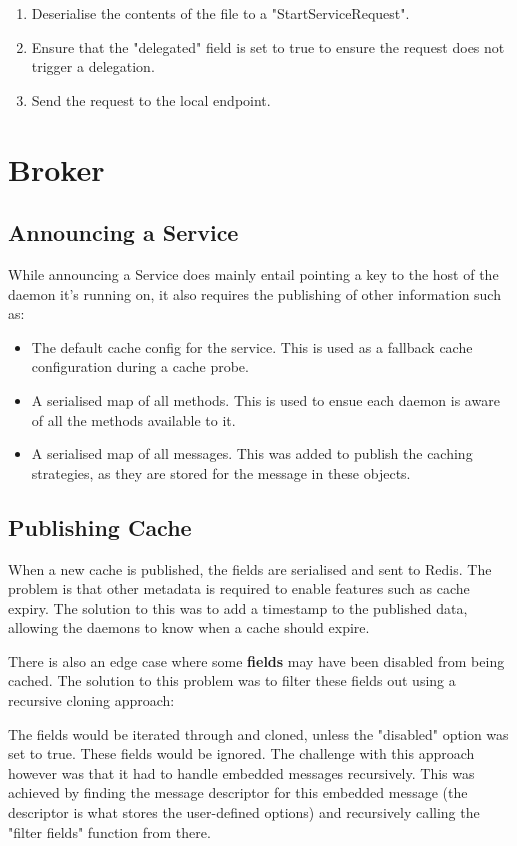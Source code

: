 \documentclass[a4paper,12pt]{report}
\begin{document}
\begin{enumerate}
    \item Deserialise the contents of the file to a "StartServiceRequest".
    \item Ensure that the "delegated" field is set to true to ensure the request does not trigger a delegation.
    \item Send the request to the local  endpoint.
\end{enumerate}

\section{Broker}
\subsection{Announcing a Service}
While announcing a Service does mainly entail pointing a key to the host of the daemon it's running on, it also requires the publishing of other information such as:

\begin{itemize}
    \item The default cache config for the service. This is used as a fallback cache configuration during a cache probe.
    \item A serialised map of all methods. This is used to ensue each daemon is aware of all the methods available to it.
    \item A serialised map of all messages. This was added to publish the caching strategies, as they are stored for the message in these objects.
\end{itemize}

\subsection{Publishing Cache}
When a new cache is published, the fields are serialised and sent to Redis.
The problem is that other metadata is required to enable features such as cache expiry.
The solution to this was to add a timestamp to the published data, allowing the daemons to know when a cache should expire.

There is also an edge case where some \textbf{fields} may have been disabled from being cached. 
The solution to this problem was to filter these fields out using a recursive cloning approach:

The fields would be iterated through and cloned, unless the "disabled" option was set to true. These fields would be ignored.
The challenge with this approach however was that it had to handle embedded messages recursively. This was achieved by finding the message descriptor for this embedded message (the descriptor is what stores the user-defined options) and recursively calling the "filter fields" function from there.
\end{document}

